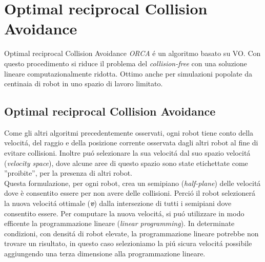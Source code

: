 
\chapter{Optimal reciprocal Collision Avoidance}
\label{cap:orca}

Optimal reciprocal Collision Avoidance \textit{ORCA} \'e un algoritmo basato su VO. 
Con questo procedimento si riduce il problema del \textit{collision-free} con una soluzione lineare computazionalmente ridotta. Ottimo anche per simulazioni popolate da centinaia di robot in uno spazio di lavoro limitato.

\section{Optimal reciprocal Collision Avoidance}

Come gli altri algoritmi precedentemente osservati, ogni robot tiene conto della velocit\'a, del raggio e della posizione corrente osservata dagli altri robot al fine di evitare collisioni. Inoltre pu\'o selezionare la sua velocit\'a dal suo spazio velocit\'a (\textit{velocity space}), dove alcune aree di questo spazio sono state etichettate come ''proibite'', per la presenza di altri robot. \\Questa formulazione, per ogni robot, crea un semipiano (\textit{half-plane}) delle velocit\'a dove è consentito essere per non avere delle collisioni. Perci\'o il robot selezioner\'a la nuova velocit\'a ottimale ({\bfseries\textit{v}}) dalla intersezione di tutti i semipiani dove consentito essere. Per computare la nuova velocit\'a, si pu\'o utilizzare in modo efficente la programmazione lineare (\textit{linear programming}). In determinate condizioni, con densit\'a di robot elevate, la programmazione lineare potrebbe non trovare un risultato, in questo caso selezioniamo la pi\'u sicura velocit\'a possibile aggiungendo una terza dimensione alla programmazione lineare.

